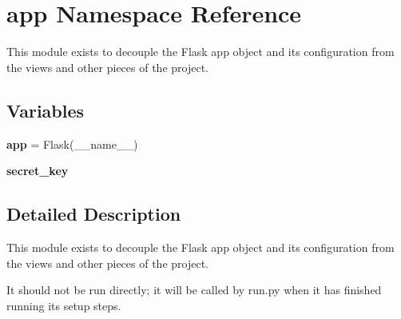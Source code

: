 \hypertarget{namespaceapp}{}\section{app Namespace Reference}
\label{namespaceapp}


This module exists to decouple the Flask app object and its configuration from the views and other pieces of the project.  


\subsection*{Variables}
\begin{DoxyCompactItemize}
\item 
{\bfseries app} = Flask(\+\_\+\+\_\+name\+\_\+\+\_\+)\hypertarget{namespaceapp_a675b4ea702c13dc4b8c05f985a25b496}{}\label{namespaceapp_a675b4ea702c13dc4b8c05f985a25b496}

\item 
{\bfseries secret\+\_\+key}\hypertarget{namespaceapp_adca7658ff5c9024a5353574d2c01cbd2}{}\label{namespaceapp_adca7658ff5c9024a5353574d2c01cbd2}

\end{DoxyCompactItemize}


\subsection{Detailed Description}
This module exists to decouple the Flask app object and its configuration from the views and other pieces of the project. 

It should not be run directly; it will be called by \textquotesingle{}run.\+py\textquotesingle{} when it has finished running its setup steps. 